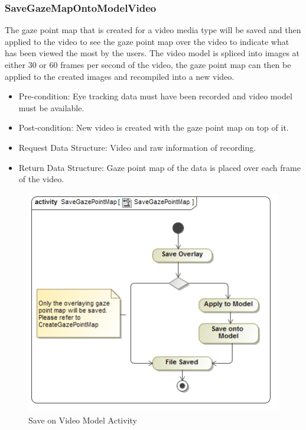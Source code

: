 	\subsubsection{SaveGazeMapOntoModelVideo}
	The gaze point map that is created for a video media type will be saved and then applied to the video to see the gaze point map over the video to indicate what has been viewed the most by the users. The video model is spliced into images at either 30 or 60 frames per second of the video, the gaze point map can then be applied to the created images and recompiled into a new video.
	\begin{itemize}
		\item Pre-condition: Eye tracking data must have been recorded and video model must be available.
		\item Post-condition: New video is created with the gaze point map on top of it.
		\item Request Data Structure: Video and raw information of recording.
		\item Return Data Structure: Gaze point map of the data is placed over each frame of the video.
	\end{itemize}
	\begin{figure}[!ht]
		\centering	
		\includegraphics[scale=0.5,width=15cm,keepaspectratio]{Diagrams/Activity_Diagram__SaveGazePointMap__SaveGazePointMap.png}	
		\caption{Save on Video Model Activity}
	\end{figure}

